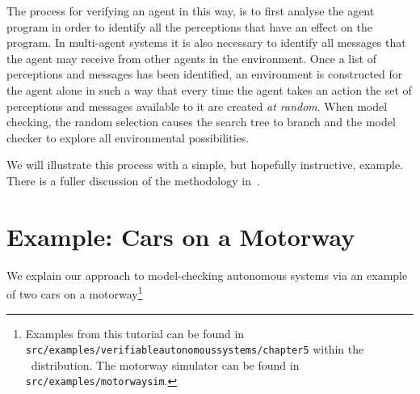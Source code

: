 The process for verifying an agent in this way, is to first analyse
the agent program in order to identify all the perceptions that have
an effect on the program.  In multi-agent systems it is also necessary
to identify all messages that the agent may receive from other agents
in the environment.  Once a list of perceptions and messages has been
identified, an environment is constructed for the agent alone in such
a way that every time the agent takes an action the set of perceptions
and messages available to it are created \emph{at random}.  When model
checking, the random selection causes the search tree to branch and
the model checker to explore all environmental possibilities.

We will illustrate this process  with a simple,
but hopefully instructive, example.  There is a fuller discussion of the methodology in~\cite{dennis14:_pract}.


\section{Example: Cars on a Motorway}
We explain our approach to model-checking autonomous systems via an
example of two cars on a motorway\footnote{Examples from this tutorial can be
found in \texttt{src/examples/verifiableautonomoussystems/chapter5}
within the \mcapl\ distribution.  The motorway simulator can be found
in \texttt{src/examples/motorwaysim}.}

